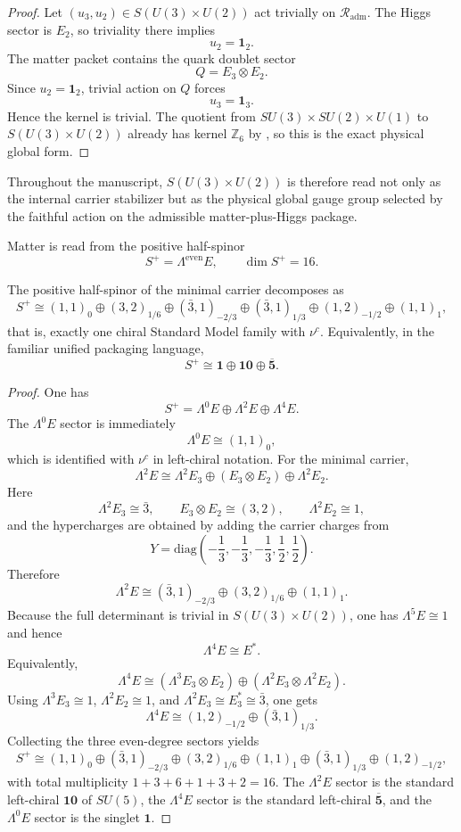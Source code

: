 \begin{proof}
Let $(u_3,u_2)\in S(U(3)\times U(2))$ act trivially on $\mathcal R_{\mathrm{adm}}$. The Higgs
sector is $E_2$, so triviality there implies
\[
u_2=\mathbf 1_2.
\]
The matter packet contains the quark doublet sector
\[
Q=E_3\otimes E_2.
\]
Since $u_2=\mathbf 1_2$, trivial action on $Q$ forces
\[
u_3=\mathbf 1_3.
\]
Hence the kernel is trivial. The quotient from $SU(3)\times SU(2)\times U(1)$ to
$S(U(3)\times U(2))$ already has kernel $\mathbb Z_6$ by , so this is
the exact physical global form.
\end{proof}

Throughout the manuscript, $S(U(3)\times U(2))$ is therefore read not only as the internal carrier
stabilizer but as the physical global gauge group selected by the faithful action on the admissible
matter-plus-Higgs package.

Matter is read from the positive half-spinor
\[
S^+=\Lambda^{\mathrm{even}}E,
\qquad
\dim S^+=16.
\]

\begin{theorem}
The positive half-spinor of the minimal carrier decomposes as
\[
S^+
\cong
(1,1)_0\oplus(3,2)_{1/6}\oplus(\bar 3,1)_{-2/3}\oplus(\bar 3,1)_{1/3}\oplus(1,2)_{-1/2}\oplus(1,1)_1,
\]
that is, exactly one chiral Standard Model family with $\nu^c$. Equivalently, in the familiar unified packaging language,
\[
S^+\cong \mathbf 1\oplus \mathbf{10}\oplus \overline{\mathbf 5}.
\]
\end{theorem}

\begin{proof}
One has
\[
S^+=\Lambda^0E\oplus\Lambda^2E\oplus\Lambda^4E.
\]
The $\Lambda^0E$ sector is immediately
\[
\Lambda^0E\cong (1,1)_0,
\]
which is identified with $\nu^c$ in left-chiral notation. For the minimal carrier,
\[
\Lambda^2E
\cong
\Lambda^2E_3\oplus(E_3\otimes E_2)\oplus\Lambda^2E_2.
\]
Here
\[
\Lambda^2E_3\cong \bar 3,
\qquad
E_3\otimes E_2\cong (3,2),
\qquad
\Lambda^2E_2\cong 1,
\]
and the hypercharges are obtained by adding the carrier charges from
\[
Y=\mathrm{diag}\!\left(-\frac13,-\frac13,-\frac13,\frac12,\frac12\right).
\]
Therefore
\[
\Lambda^2E
\cong
(\bar 3,1)_{-2/3}\oplus(3,2)_{1/6}\oplus(1,1)_1.
\]
Because the full determinant is trivial in $S(U(3)\times U(2))$, one has $\Lambda^5E\cong 1$ and hence
\[
\Lambda^4E\cong E^\ast.
\]
Equivalently,
\[
\Lambda^4E
\cong
(\Lambda^3E_3\otimes E_2)\oplus(\Lambda^2E_3\otimes\Lambda^2E_2).
\]
Using $\Lambda^3E_3\cong 1$, $\Lambda^2E_2\cong 1$, and $\Lambda^2E_3\cong E_3^\ast\cong\bar 3$, one gets
\[
\Lambda^4E\cong (1,2)_{-1/2}\oplus(\bar 3,1)_{1/3}.
\]
Collecting the three even-degree sectors yields
\[
S^+
\cong
(1,1)_0\oplus(\bar 3,1)_{-2/3}\oplus(3,2)_{1/6}\oplus(1,1)_1\oplus(\bar 3,1)_{1/3}\oplus(1,2)_{-1/2},
\]
with total multiplicity $1+3+6+1+3+2=16$. The $\Lambda^2E$ sector is the standard left-chiral $\mathbf{10}$ of $SU(5)$, the $\Lambda^4E$ sector is the standard left-chiral $\overline{\mathbf 5}$, and the $\Lambda^0E$ sector is the singlet $\mathbf 1$.
\end{proof}

